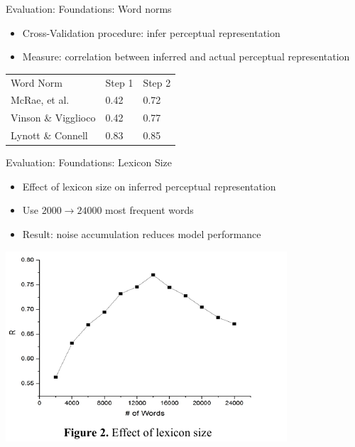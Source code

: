 \documentclass[12pt,a4paper]{beamer}
\begin{document}
\begin{frame}{Evaluation: Foundations: Word norms}
\begin{itemize}
\item Cross-Validation procedure: infer perceptual representation
\item Measure: correlation between inferred and actual perceptual representation
\end{itemize}
\begin{table}
    \begin{tabular}{lll}
    Word Norm          & Step 1 & Step 2 \\
    McRae, et al.      & 0.42   & 0.72   \\
    Vinson \& Vigglioco & 0.42   & 0.77   \\
    Lynott \& Connell   & 0.83   & 0.85   \\
    \end{tabular}
\end{table}
\end{frame}

\begin{frame}{Evaluation: Foundations: Lexicon Size}
\begin{itemize}
\item Effect of lexicon size on inferred perceptual representation
\item Use $2000 \to 24000$ most frequent words
\item Result: noise accumulation reduces model performance
\end{itemize}
\includegraphics[scale=0.8]{figure_2_effect_of_lexicon_size.png}

\end{frame}
\end{document}
